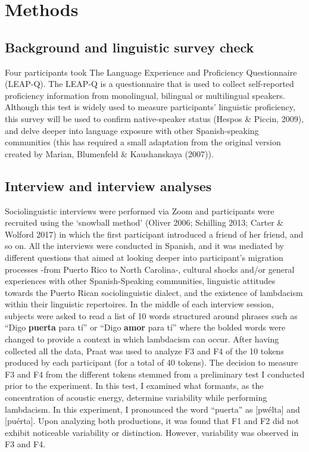 \documentclass[
  a4paper,
  11pt,
  twocolumn]{article}
\begin{document}
\section{Methods}

\subsection{Background and linguistic survey check}

Four participants took The Language Experience and Proficiency
Questionnaire (LEAP-Q). The LEAP-Q is a questionnaire that is used to
collect self-reported proficiency information from monolingual,
bilingual or multilingual speakers. Although this test is widely used to
measure participants' linguistic proficiency, this survey will be used
to confirm native-speaker status (Hespos \& Piccin, 2009), and delve
deeper into language exposure with other Spanish-speaking communities
(this has required a small adaptation from the original version created
by Marian, Blumenfeld \& Kaushanskaya (2007)).

\subsection{Interview and interview analyses}

Sociolinguistic interviews were performed via Zoom and participants were
recruited using the `snowball method' (Oliver 2006; Schilling 2013;
Carter \& Wolford 2017) in which the first participant introduced a
friend of her friend, and so on. All the interviews were conducted in
Spanish, and it was mediated by different questions that aimed at
looking deeper into participant's migration processes -from Puerto Rico
to North Carolina-, cultural shocks and/or general experiences with
other Spanish-Speaking communities, linguistic attitudes towards the
Puerto Rican sociolinguistic dialect, and the existence of lambdacism
within their linguistic repertoires. In the middle of each interview
session, subjects were asked to read a list of 10 words structured
around phrases such as ``Digo \textbf{puerta} para tí'' or ``Digo
\textbf{amor} para tí'' where the bolded words were changed to provide a
context in which lambdacism can occur. After having collected all the
data, Praat was used to analyze F3 and F4 of the 10 tokens produced by
each participant (for a total of 40 tokens). The decision to measure F3
and F4 from the different tokens stemmed from a preliminary test I
conducted prior to the experiment. In this test, I examined what
formants, as the concentration of acoustic energy, determine variability
while performing lambdacism. In this experiment, I pronounced the word
``puerta'' as {[}pwélta{]} and {[}puérta{]}. Upon analyzing both
productions, it was found that F1 and F2 did not exhibit noticeable
variability or distinction. However, variability was observed in F3 and
F4.
\end{document}
